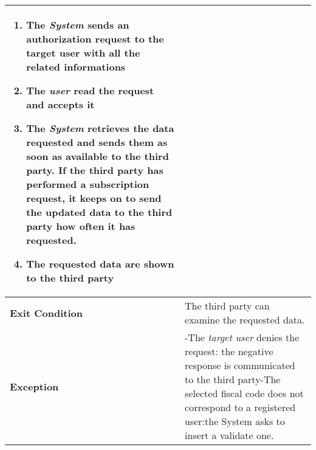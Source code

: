 \begin{table}[H]
\begin{tabular}{|p{3.5cm}|p{10.3cm}|}
\begin{enumerate}[leftmargin=0.5cm]
                            \item The \emph{System} sends an authorization request to the target user with all the related informations
                                            
                                            \item  The  \emph{user} read the request and accepts it
                                            \item The \emph{System} retrieves the data requested and sends them as soon as available to the third party. If the third party has performed a subscription request, it keeps on to send the updated data to the third party how often it has requested.
                                            \item The requested data are shown to the third party
                                
                                          \end{enumerate}
    										\\
    \hline
    \textbf{\large{Exit Condition}} 	& The third party can examine the requested data. \\
    
    \hline
    \textbf{\large{Exception}} 			& -The \emph{target user} denies the request: the negative response is communicated to the third party\newline -The selected fiscal code does not correspond to a registered user:the System asks to insert a validate one.\\
    
    \hline
    
    
    \end{tabular}
	
\end{table}
